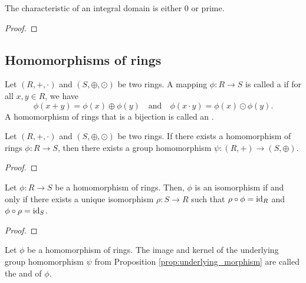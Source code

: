 \begin{prop}
The characteristic of an integral domain is either $ 0 $ or prime.
\end{prop}
\begin{proof}
\end{proof}

\subsection*{Homomorphisms of rings}

\begin{defn}
Let $ (R,+,\cdot) $ and $ (S,\oplus,\odot) $ be two rings. A mapping $ \phi:R\to S $ is called a  if for all $ x,y\in R $, we have
\begin{equation*}
    \phi(x+y)=\phi(x)\oplus\phi(y) \quad\text{and}\quad \phi(x\cdot y)=\phi(x)\odot\phi(y).
\end{equation*}
A homomorphism of rings that is a bijection is called an .
\end{defn}

\begin{prop}\label{prop:underlying_morphism}
Let $ (R,+,\cdot) $ and $ (S,\oplus,\odot) $ be two rings. If there exists a homomorphism of rings $ \phi:R\to S $, then there exists a group homomorphism $ \psi:(R,+)\to(S,\oplus) $.
\end{prop}
\begin{proof}
\end{proof}

\begin{prop}
Let $ \phi:R\to S $ be a homomorphism of rings. Then, $ \phi $ is an isomorphism if and only if there exists a unique isomorphism $ \rho:S\to R $ such that $ \rho\circ\phi=\operatorname{id}_R $ and $ \phi\circ\rho=\operatorname{id}_S $.
\end{prop}
\begin{proof}
\end{proof}

\begin{defn}
Let $ \phi $ be a homomorphism of rings. The image and kernel of the underlying group homomorphism $ \psi $ from Proposition \ref{prop:underlying_morphism} are called the  and  of $ \phi $.
\end{defn}

